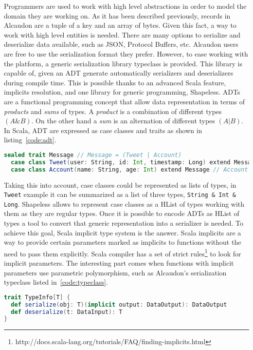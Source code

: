 Programmers are used to work with high level abstractions in order to model the
domain they are working on. As it has been described previously, records in
Alcaudon are a tuple of a key and an array of bytes. Given this fact, a way to
work with high level entities is needed. There are many options to serialize and
deserialize data available, such as JSON, Protocol Buffers, etc. Alcaudon users
are free to use the serialization format they prefer. However, to ease working
with the platform, a generic serialization library typeclass is provided. This
library is capable of, given an \acs{ADT} generate automatically serializers and
deserializers during compile time. This is possible thanks to an advanced Scala
feature, implicits resolution, and one library for generic programming,
Shapeless. \acs{ADT}s are a functional programming concept that allow data
representation in terms of \textit{products} and \textit{sums} of types. A
\textit{product} is a combination of different types $(A \& B)$. On the other
hand a \textit{sum} is an alternation of different types $(A | B)$. In Scala,
\acs{ADT} are expressed as case classes and traits as shown in
listing~\ref{code:adt}.

\begin{lstlisting}[language=scala, frame=trBL, label=code:adt, float=ht, caption = {\acs{ADT} example}]
  sealed trait Message // Message = (Tweet | Account)
  case class Tweet(user: String, id: Int, timestamp: Long) extend Message // Tweet = (String & Int & Long)
  case class Account(name: String, age: Int) extend Message // Account = (String & Int)
\end{lstlisting}

Taking this into account, case classes could be represented as lists of types,
in \lstinline[columns=fixed]{Tweet} example it can be summarized as a list of
three types, \lstinline[columns=fixed]{String & Int & Long}. Shapeless allows
to represent case classes as a \acf{HList} of types working with them
as they are regular types. Once it is possible to encode \acs{ADT}s as
\acs{HList} of types a tool to convert that generic representation into
a serializer is needed. To achieve this goal, Scala implicit type system is the
answer. Scala implicits are a way to provide certain parameters marked as
implicits to functions without the need to pass them explicitly. Scala compiler has
a set of strict rules\footnote{http://docs.scala-lang.org/tutorials/FAQ/finding-implicits.html}
to look for implicit parameters. The interesting part comes when functions with implicit
parameters use parametric polymorphism, such as Alcaudon's serialization typeclass
listed in~\ref{code:typeclass}.
\begin{lstlisting}[language=scala, frame=trBL, label=code:typeclass, float=ht, caption = {Serializer-Deserializer typeclass}]
trait TypeInfo[T] {
  def serialize(obj: T)(implicit output: DataOutput): DataOutput
  def deserialize(t: DataInput): T
}
\end{lstlisting}

